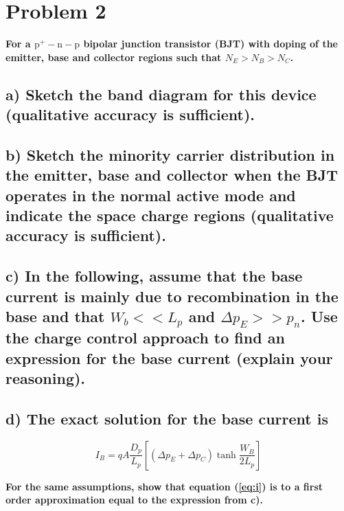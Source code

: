 \section{Problem 2}
\textbf{For a $\mathrm{p}^{+}-\mathrm{n}-\mathrm{p}$ bipolar junction transistor (BJT) with doping of the emitter, base and collector regions such that $N_E>N_B>N_C$.}
\subsection*{a) Sketch the band diagram for this device (qualitative accuracy is sufficient).}


\subsection*{b) Sketch the minority carrier distribution in the emitter, base and collector when the BJT operates in the normal active mode and indicate the space charge regions (qualitative accuracy is sufficient).}


\subsection*{c) In the following, assume that the base current is mainly due to recombination in the base and that $W_b<<L_p$ and $\Delta p_E>>p_n$. Use the charge control approach to find an expression for the base current (explain your reasoning).}



\subsection*{d) The exact solution for the base current is}

\begin{equation}
    I_B=q A \frac{D_p}{L_p}\left[\left(\Delta p_E+\Delta p_C\right) \tanh \frac{W_B}{2 L_p}\right]
    \label{eq:i}
\end{equation}


\textbf{For the same assumptions, show that equation (\ref*{eq:i}) is to a first order approximation equal to the expression from c).}